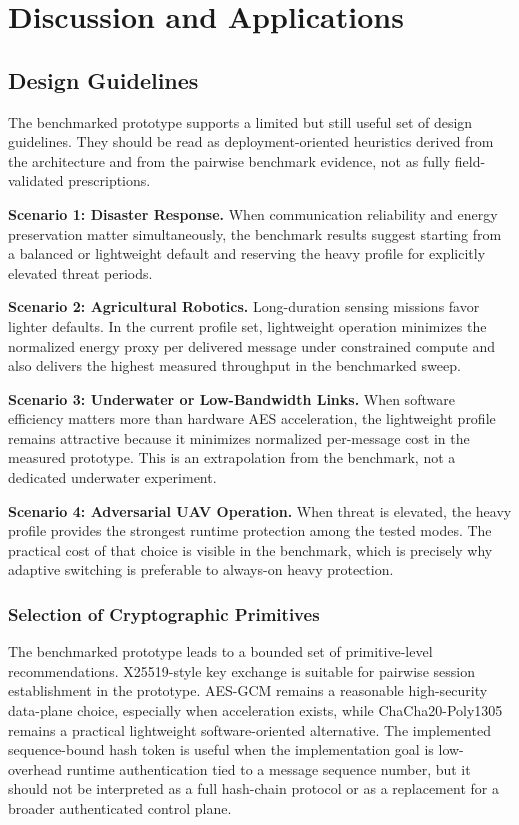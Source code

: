 \chapter{Discussion and Applications}
\label{chap:discussion}

\section{Design Guidelines}
\label{sec:design_guidelines}

The benchmarked prototype supports a limited but still useful set of design guidelines. They should be read as deployment-oriented heuristics derived from the architecture and from the pairwise benchmark evidence, not as fully field-validated prescriptions.

\textbf{Scenario 1: Disaster Response.}  
When communication reliability and energy preservation matter simultaneously, the benchmark results suggest starting from a balanced or lightweight default and reserving the heavy profile for explicitly elevated threat periods.

\textbf{Scenario 2: Agricultural Robotics.}  
Long-duration sensing missions favor lighter defaults. In the current profile set, lightweight operation minimizes the normalized energy proxy per delivered message under constrained compute and also delivers the highest measured throughput in the benchmarked sweep.

\textbf{Scenario 3: Underwater or Low-Bandwidth Links.}  
When software efficiency matters more than hardware AES acceleration, the lightweight profile remains attractive because it minimizes normalized per-message cost in the measured prototype. This is an extrapolation from the benchmark, not a dedicated underwater experiment.

\textbf{Scenario 4: Adversarial UAV Operation.}  
When threat is elevated, the heavy profile provides the strongest runtime protection among the tested modes. The practical cost of that choice is visible in the benchmark, which is precisely why adaptive switching is preferable to always-on heavy protection.

\subsection*{Selection of Cryptographic Primitives}

The benchmarked prototype leads to a bounded set of primitive-level recommendations. X25519-style key exchange is suitable for pairwise session establishment in the prototype. AES-GCM remains a reasonable high-security data-plane choice, especially when acceleration exists, while ChaCha20-Poly1305 remains a practical lightweight software-oriented alternative. The implemented sequence-bound hash token is useful when the implementation goal is low-overhead runtime authentication tied to a message sequence number, but it should not be interpreted as a full hash-chain protocol or as a replacement for a broader authenticated control plane.

